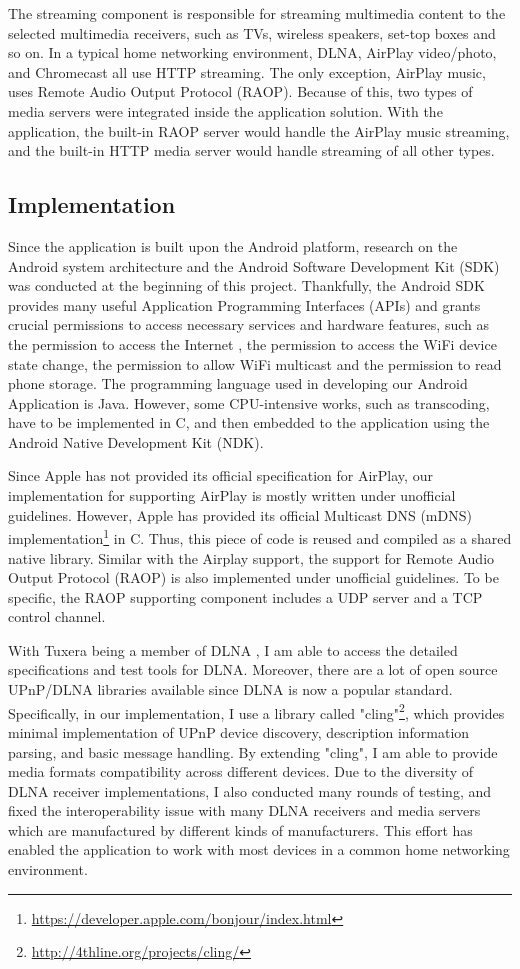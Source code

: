 The streaming component is responsible for streaming multimedia content to the
selected multimedia receivers, such as TVs, wireless speakers, set-top boxes
and so on. In a typical home networking environment, DLNA, AirPlay video/photo,
and Chromecast all use HTTP streaming. The only exception, AirPlay music, uses
Remote Audio Output Protocol (RAOP). Because of this, two types of media
servers were integrated inside the application solution. With the application,
the built-in RAOP server would handle the AirPlay music streaming, and the
built-in HTTP media server would handle streaming of all other types.

\subsection{Implementation\label{3_2}}
Since the application is built upon the Android platform, research on the
Android system architecture and the Android Software Development Kit (SDK) was
conducted at the beginning of this project. Thankfully, the Android SDK provides
many useful Application Programming Interfaces (APIs) and grants crucial
permissions to access necessary services and hardware features, such as the
permission to access the Internet , the permission to access the WiFi device
state change, the permission to allow WiFi multicast and  the permission to
read phone storage. The programming language used in developing our Android
Application is Java. However, some CPU-intensive works, such as transcoding,
have to be implemented in C, and then embedded to the application using the
Android Native Development Kit (NDK).

Since Apple has not provided its official specification for AirPlay, our
implementation for supporting AirPlay is mostly written under unofficial
guidelines. However, Apple has provided its official Multicast DNS (mDNS)
implementation\footnote{\url{https://developer.apple.com/bonjour/index.html}} in
C. Thus, this piece of code is reused and compiled as a shared native library. Similar with
the Airplay support, the support for Remote Audio Output Protocol (RAOP) is
also implemented under unofficial guidelines.
To be specific, the RAOP supporting component includes a UDP server and a TCP
control channel.

With Tuxera being a member of DLNA , I am able to access the detailed
specifications and test tools for DLNA. Moreover, there are a lot of open
source UPnP/DLNA libraries available since DLNA is now a popular standard.
Specifically, in our implementation, I use a library called
"cling"\footnote{\url{http://4thline.org/projects/cling/}}, which provides
minimal implementation of UPnP device discovery, description information
parsing, and basic message handling. By extending "cling", I am able to provide
media formats compatibility across different devices. Due to the diversity of
DLNA receiver implementations, I also conducted many rounds of testing, and
fixed the interoperability issue with many DLNA receivers and media servers
which are manufactured by different kinds of manufacturers. This effort has
enabled the application to work with most devices in a common home networking
environment.

